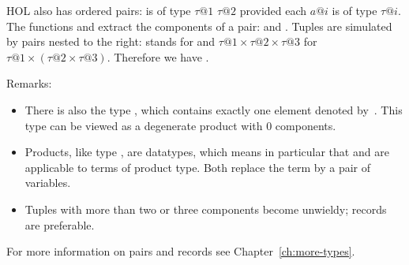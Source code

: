 %
\begin{isabellebody}%
\def\isabellecontext{pairs}%
\isamarkupfalse%
%
\begin{isamarkuptext}%
\label{sec:pairs}
HOL also has ordered pairs:  is of type $\tau@1$
 $\tau@2$ provided each $a@i$ is of type
$\tau@i$. The functions  and
 extract the components of a pair:
  and . Tuples
are simulated by pairs nested to the right:  stands
for  and $\tau@1 \times \tau@2 \times \tau@3$ for
$\tau@1 \times (\tau@2 \times \tau@3)$. Therefore we have
.

Remarks:
\begin{itemize}
\item
There is also the type , which contains exactly one
element denoted by~\cdx{()}.  This type can be viewed
as a degenerate product with 0 components.
\item
Products, like type , are datatypes, which means
in particular that  and  are applicable to
terms of product type.
Both replace the term by a pair of variables.
\item
Tuples with more than two or three components become unwieldy;
records are preferable.
\end{itemize}
For more information on pairs and records see Chapter~\ref{ch:more-types}.%
\end{isamarkuptext}%
\isamarkuptrue%
\isanewline
\isamarkupfalse%
\end{isabellebody}%
